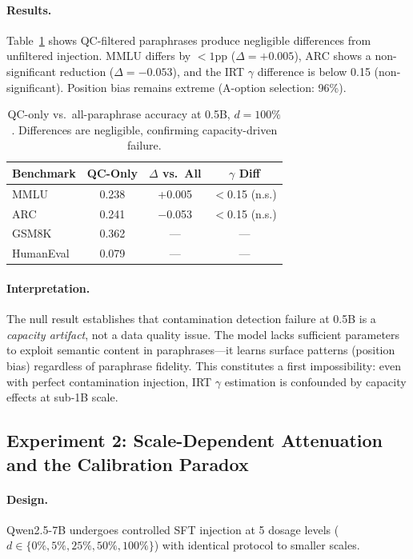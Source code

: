 \documentclass[11pt,a4paper]{article}
\begin{document}
\paragraph{Results.} Table~\ref{tab:qc} shows QC-filtered paraphrases produce negligible differences from unfiltered injection. MMLU differs by $<1$pp ($\Delta = +0.005$), ARC shows a non-significant reduction ($\Delta = -0.053$), and the IRT $\gamma$ difference is below 0.15 (non-significant). Position bias remains extreme (A-option selection: 96\%).

\begin{table}[h]
\centering
\caption{QC-only vs.\ all-paraphrase accuracy at 0.5B, $d=100\%$. Differences are negligible, confirming capacity-driven failure.}
\label{tab:qc}
\begin{tabular}{lccc}
\toprule
Benchmark & QC-Only & $\Delta$ vs.\ All & $\gamma$ Diff \\
\midrule
MMLU & 0.238 & +0.005 & $<$0.15 (n.s.) \\
ARC & 0.241 & $-$0.053 & $<$0.15 (n.s.) \\
GSM8K & 0.362 & --- & --- \\
HumanEval & 0.079 & --- & --- \\
\bottomrule
\end{tabular}
\end{table}

\paragraph{Interpretation.} The null result establishes that contamination detection failure at 0.5B is a \emph{capacity artifact}, not a data quality issue. The model lacks sufficient parameters to exploit semantic content in paraphrases---it learns surface patterns (position bias) regardless of paraphrase fidelity. This constitutes a first impossibility: even with perfect contamination injection, IRT $\gamma$ estimation is confounded by capacity effects at sub-1B scale.

\subsection{Experiment 2: Scale-Dependent Attenuation and the Calibration Paradox}
\label{sec:exp-scale}

\paragraph{Design.} Qwen2.5-7B undergoes controlled SFT injection at 5 dosage levels ($d \in \{0\%, 5\%, 25\%, 50\%, 100\%\}$) with identical protocol to smaller scales.
\end{document}
